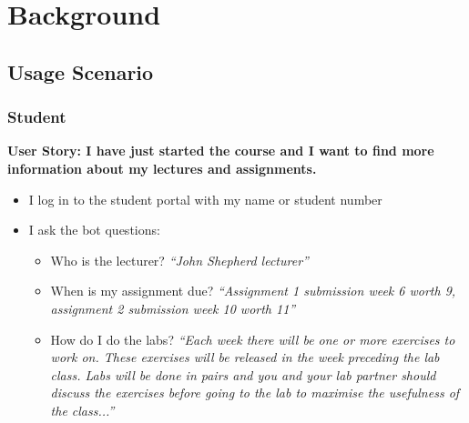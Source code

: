 \section{Background}

\subsection{Usage Scenario}
\subsubsection{Student}
\textbf{User Story: I have just started the course and I want to find more information about my lectures and assignments.}
\begin{itemize}
    \item{I log in to the student portal with my name or student number}
    \item{I ask the bot questions:}
    \begin{itemize}
        \item{Who is the lecturer? \textit{“John Shepherd lecturer”}}
        \item{When is my assignment due? \textit{“Assignment 1 submission week 6 worth 9, assignment 2 submission week 10 worth 11”}}
        \item{How do I do the labs? \textit{“Each week there will be one or more exercises to work on. These exercises will be released in the week preceding the lab class. Labs will be done in pairs and you and your lab partner should discuss the exercises before going to the lab to maximise the usefulness of the class...”}}
    \end{itemize}
\end{itemize}

